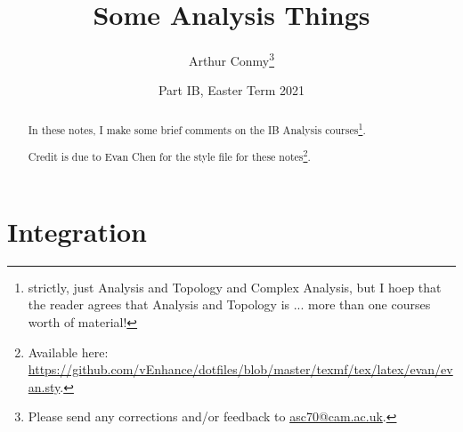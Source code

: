 \documentclass[11pt]{scrartcl}
\begin{document}
\title{Some Analysis Things}
\author{Arthur Conmy\footnote{Please send any corrections and/or feedback to \url{asc70@cam.ac.uk}.}}
\date{Part IB, Easter Term 2021}

\maketitle
\begin{abstract}
In these notes, I make some brief comments on the IB Analysis courses\footnote{strictly, just Analysis and Topology and Complex Analysis, but I hoep that the reader agrees that Analysis and Topology is ... more than one courses worth of material!}.

Credit is due to Evan Chen for the style file for these notes\footnote{Available here: \url{https://github.com/vEnhance/dotfiles/blob/master/texmf/tex/latex/evan/evan.sty}.}.
\end{abstract}

\section{Integration}

\end{document}
